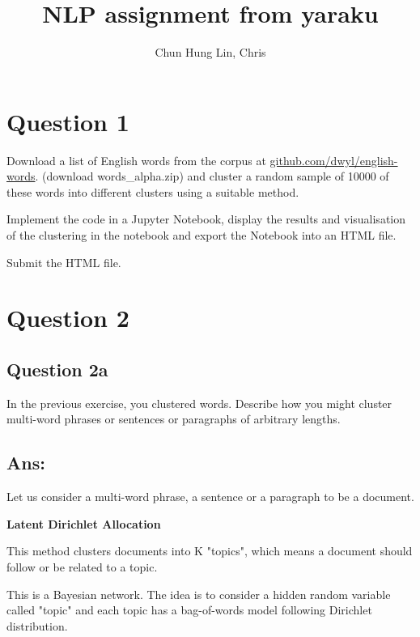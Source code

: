 \documentclass{kthreport}
\title{NLP assignment from yaraku}
\author{Chun Hung Lin, Chris}
\begin{document}
\maketitle


\section{Question 1}

Download a list of English words from the corpus at \hspace{0.1em}
\href{https://github.com/dwyl/english-words}{github.com/dwyl/english-words}.
(download words\_alpha.zip) and cluster a random sample of 10000 of
these words into different clusters using a suitable method.

Implement the code in a Jupyter Notebook, display the results and visualisation
of the clustering in the notebook and export the Notebook into an HTML file.

Submit the HTML file.

\section{Question 2}
\subsection{Question 2a}
In the previous exercise, you clustered words.
Describe how you might cluster multi-word phrases or sentences or paragraphs of
arbitrary lengths.

\subsection*{Ans:}

Let us consider a multi-word phrase, a sentence or a paragraph to be a document.

\textbf{Latent Dirichlet Allocation}

This method clusters documents into K "topics", which means a document should
follow or be related to a topic.

This is a Bayesian network. The idea is to consider a hidden random variable
called "topic" and each topic has a bag-of-words model following
Dirichlet distribution.
\end{document}
